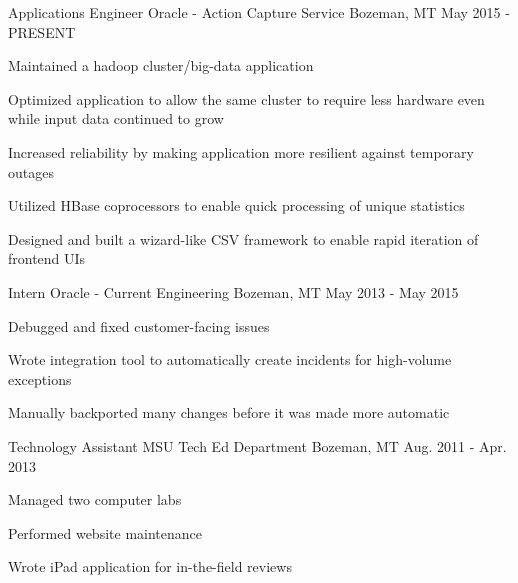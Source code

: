 

\begin{cventries}

  \cventry
    {Applications Engineer} %
    {Oracle - Action Capture Service} %
    {Bozeman, MT} %
    {May 2015 - PRESENT} %
    {
      \begin{cvitems} %
        \item {Maintained a hadoop cluster/big-data application}
        \item {Optimized application to allow the same cluster to require less hardware even while input data continued to grow}
        \item {Increased reliability by making application more resilient against temporary outages}
        \item {Utilized HBase coprocessors to enable quick processing of unique statistics}
        \item {Designed and built a wizard-like CSV framework to enable rapid iteration of frontend UIs}
      \end{cvitems}
    }

  \cventry
    {Intern} %
    {Oracle - Current Engineering} %
    {Bozeman, MT} %
    {May 2013 - May 2015} %
    {
      \begin{cvitems} %
        \item {Debugged and fixed customer-facing issues}
        \item {Wrote integration tool to automatically create incidents for high-volume exceptions}
        \item {Manually backported many changes before it was made more automatic}
      \end{cvitems}
    }

  \cventry
    {Technology Assistant} %
    {MSU Tech Ed Department} %
    {Bozeman, MT} %
    {Aug. 2011 - Apr. 2013} %
    {
      \begin{cvitems} %
        \item {Managed two computer labs}
        \item {Performed website maintenance}
        \item {Wrote iPad application for in-the-field reviews}
      \end{cvitems}
    }

\end{cventries}
